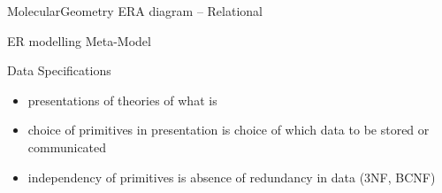 \documentclass[xcolor=pst,dvips]{beamer}   %
\renewcommand{\erpictureFolder}[0]{../SharedPictures}
\begin{document}
\begin{frame}{MolecularGeometry  ERA diagram -- Relational}
\begin{center}
\scalebox{0.5}{

}
\end{center}
\end{frame}


\begin{frame}{ER modelling Meta-Model}
\scalebox{0.23}{

}
\end{frame}


\begin{frame}{Data Specifications}
\begin{itemize}
\item presentations of theories of what is
\item choice of primitives in presentation is choice of which data to be stored or communicated
\item independency of primitives is absence of redundancy in data (3NF, BCNF)
\end{itemize}
\end{frame}
\end{document}

